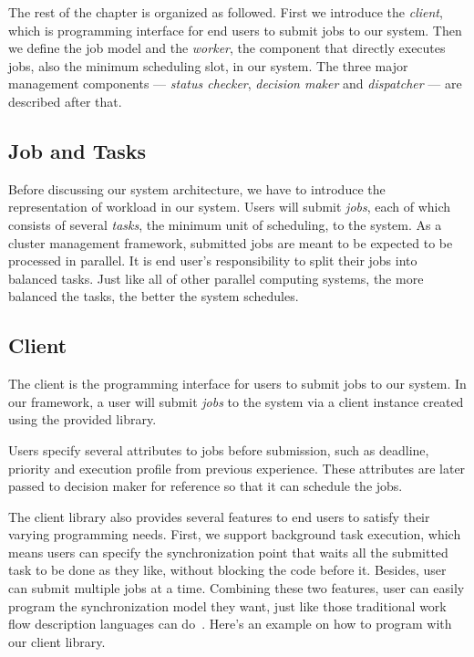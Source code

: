The rest of the chapter is organized as followed.  
First we introduce the \emph{client}, which is programming interface for
end users to submit jobs to our system.
Then we define the job model and the \emph{worker}, the component that
directly executes jobs, also the minimum scheduling slot, in our system.
The three major management components --- \emph{status checker},
\emph{decision maker} and \emph{dispatcher} --- are described after
that.

\subsection{Job and Tasks}

Before discussing our system architecture, we have to introduce the
representation of workload in our system.
Users will submit \emph{jobs}, each of which consists of several
\emph{tasks}, the minimum unit of scheduling, to the system.
As a cluster management framework, submitted jobs are meant to be
expected to be processed in parallel.
It is end user's responsibility to split their jobs into balanced tasks.
Just like all of other parallel computing systems, the more balanced the
tasks, the better the system schedules.

\subsection{Client}

The client is the programming interface for users to submit jobs to our
system.
In our framework, a user will submit \emph{jobs} to the system via a
client instance created using the provided library.

Users specify several attributes to jobs before submission, such as
deadline, priority and execution profile from previous experience.
These attributes are later passed to decision maker for reference so
that it can schedule the jobs.

The client library also provides several features to end users to
satisfy their varying programming needs.
First, we support background task execution, which means users can
specify the synchronization point that waits all the submitted task to
be done as they like, without blocking the code before it.
Besides, user can submit multiple jobs at a time.
Combining these two features, user can easily program the
synchronization model they want, just like those traditional work flow
description languages can do~\cite{cite:workflow-management}.
Here's an example on how to program with our client library.

